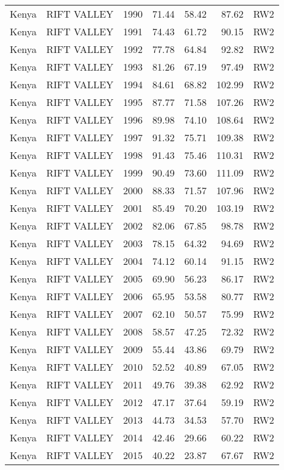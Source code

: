 \begin{longtable}{lllrrrl}
  Kenya & RIFT VALLEY & 1990 & 71.44 & 58.42 & 87.62 & RW2 \\ 
  Kenya & RIFT VALLEY & 1991 & 74.43 & 61.72 & 90.15 & RW2 \\ 
  Kenya & RIFT VALLEY & 1992 & 77.78 & 64.84 & 92.82 & RW2 \\ 
  Kenya & RIFT VALLEY & 1993 & 81.26 & 67.19 & 97.49 & RW2 \\ 
  Kenya & RIFT VALLEY & 1994 & 84.61 & 68.82 & 102.99 & RW2 \\ 
  Kenya & RIFT VALLEY & 1995 & 87.77 & 71.58 & 107.26 & RW2 \\ 
  Kenya & RIFT VALLEY & 1996 & 89.98 & 74.10 & 108.64 & RW2 \\ 
  Kenya & RIFT VALLEY & 1997 & 91.32 & 75.71 & 109.38 & RW2 \\ 
  Kenya & RIFT VALLEY & 1998 & 91.43 & 75.46 & 110.31 & RW2 \\ 
  Kenya & RIFT VALLEY & 1999 & 90.49 & 73.60 & 111.09 & RW2 \\ 
  Kenya & RIFT VALLEY & 2000 & 88.33 & 71.57 & 107.96 & RW2 \\ 
  Kenya & RIFT VALLEY & 2001 & 85.49 & 70.20 & 103.19 & RW2 \\ 
  Kenya & RIFT VALLEY & 2002 & 82.06 & 67.85 & 98.78 & RW2 \\ 
  Kenya & RIFT VALLEY & 2003 & 78.15 & 64.32 & 94.69 & RW2 \\ 
  Kenya & RIFT VALLEY & 2004 & 74.12 & 60.14 & 91.15 & RW2 \\ 
  Kenya & RIFT VALLEY & 2005 & 69.90 & 56.23 & 86.17 & RW2 \\ 
  Kenya & RIFT VALLEY & 2006 & 65.95 & 53.58 & 80.77 & RW2 \\ 
  Kenya & RIFT VALLEY & 2007 & 62.10 & 50.57 & 75.99 & RW2 \\ 
  Kenya & RIFT VALLEY & 2008 & 58.57 & 47.25 & 72.32 & RW2 \\ 
  Kenya & RIFT VALLEY & 2009 & 55.44 & 43.86 & 69.79 & RW2 \\ 
  Kenya & RIFT VALLEY & 2010 & 52.52 & 40.89 & 67.05 & RW2 \\ 
  Kenya & RIFT VALLEY & 2011 & 49.76 & 39.38 & 62.92 & RW2 \\ 
  Kenya & RIFT VALLEY & 2012 & 47.17 & 37.64 & 59.19 & RW2 \\ 
  Kenya & RIFT VALLEY & 2013 & 44.73 & 34.53 & 57.70 & RW2 \\ 
  Kenya & RIFT VALLEY & 2014 & 42.46 & 29.66 & 60.22 & RW2 \\ 
  Kenya & RIFT VALLEY & 2015 & 40.22 & 23.87 & 67.67 & RW2 \\ 

\end{longtable}
